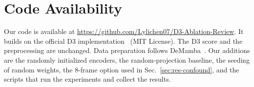 \documentclass[conference]{IEEEtran}
\begin{document}
\section*{Code Availability}

Our code is available at
\url{https://github.com/Lylichen07/D3-Ablation-Review}. It builds on the official D3 implementation~\cite{d3code} (MIT
License). The D3 score and the preprocessing are unchanged. Data
preparation follows DeMamba~\cite{chen2024demamba}. Our additions are the
randomly initialized encoders, the random-projection baseline, the seeding of
random weights, the 8-frame option used in Sec.~\ref{sec:res-confound}, and
the scripts that run the experiments and collect the results.

{\small


}
\end{document}
